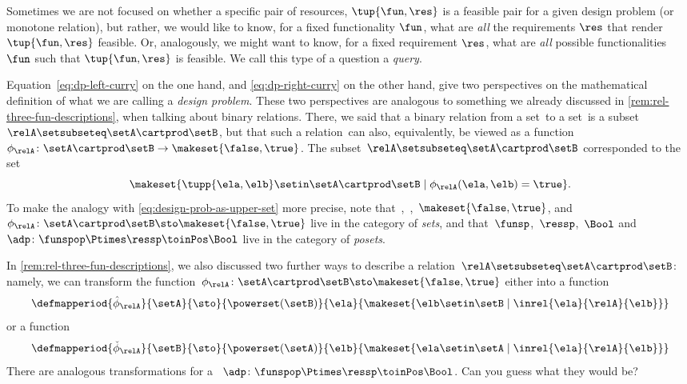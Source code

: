 Sometimes we are not focused on whether a specific pair of resources, $\tup{\fun, \res}$ is a feasible pair for a given design problem (or monotone relation), but rather, we would like to know, for a fixed functionality $\fun$, what are \emph{all} the requirements $\res$ that render $\tup{\fun, \res}$ feasible. Or, analogously, we might want to know, for a fixed requirement $\res$, what are \emph{all} possible functionalities $\fun$ such that $\tup{\fun, \res}$ is feasible. We call this type of a question a \emph{query}. 


Equation~\cref{eq:dp-left-curry} on the one hand, and \cref{eq:dp-right-curry} on the other hand, give two perspectives on the mathematical definition of what we are calling a \emph{design problem}.
These two perspectives are analogous to something we already discussed in \cref{rem:rel-three-fun-descriptions}, when talking about binary relations.
There, we said that a binary relation from a set~\setA to a set~\setB is a subset~$\relA \setsubseteq \setA \cartprod \setB$,
but that such a relation~\relA can also, equivalently, be viewed as a function~$\phi_{\relA}\colon \setA \cartprod\setB \to \makeset{ \false, \true }$.
The subset~$\relA \setsubseteq \setA \cartprod \setB$ corresponded to the set
\begin{equation}
    \makeset{ \tupp{\ela, \elb} \setin \setA \cartprod \setB \mid \phi_{\relA}(\ela, \elb) = \true }.
\end{equation}
%
To make the analogy with \cref{eq:design-prob-as-upper-set} more precise, note that~\setA,~\setB,~$\makeset{ \false, \true }$, and~$\phi_{\relA}\colon \setA \cartprod\setB \sto \makeset{ \false, \true }$ live in the category of \emph{sets}, and that~$\funsp$,~$\ressp$,~$\Bool$ and~$\adp\colon \funspop \Ptimes \ressp\toinPos \Bool$ live in the category of \emph{posets}.

In \cref{rem:rel-three-fun-descriptions}, we also discussed two further ways to describe a relation~$\relA \setsubseteq \setA \cartprod \setB$: namely, we can transform the function~$\phi_{\relA}\colon \setA \cartprod\setB \sto \makeset{ \false, \true }$ either into a function
\begin{equation}
    \label{eq:curried-relation-again}
    \defmapperiod{
        \hat \phi_{\relA}}{\setA}{\sto
    }{
        \powerset(\setB)
    }{
        \ela
    }{
        \makeset{ \elb \setin \setB \mid \inrel{\ela
            }{
                \relA
            }{
                \elb} }
    }
\end{equation}
or a function
\begin{equation}
    \label{eq:co-curried-relation-again}
    \defmapperiod{
        \check \phi_{\relA}}{\setB}{\sto
    }{
        \powerset (\setA)
    }{
        \elb
    }{
        \makeset{ \ela \setin \setA \mid \inrel{\ela
            }{
                \relA
            }{
                \elb}}
    }
\end{equation}
%
There are analogous transformations for a ~$\adp\colon \funspop \Ptimes \ressp\toinPos \Bool$.
Can you guess what they would be?

